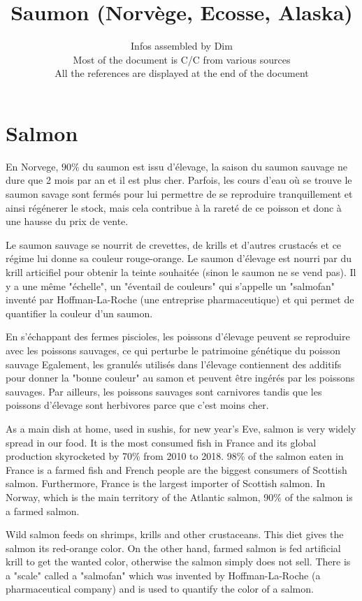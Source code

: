\documentclass{article}
\title{\textbf{Saumon (Norvège, Ecosse, Alaska)}}
\date{Infos assembled by Dim \\
Most of the document is C/C from various sources\\
All the references are displayed at the end of the document
}
\begin{document}
\maketitle

\newpage
\tableofcontents
\newpage

\section{Salmon}
En Norvege, $90 \%$ du saumon est issu d'élevage, la saison du saumon sauvage ne dure que 2 mois par an et il est plus cher. Parfois, les cours d'eau où se trouve le saumon savage sont fermés pour lui permettre de se reproduire tranquillement et ainsi régénerer le stock, mais cela contribue à la rareté de ce poisson et donc à une hausse du prix de vente.

Le saumon sauvage se nourrit de crevettes, de krills et d'autres crustacés et ce régime lui donne sa couleur rouge-orange.
Le saumon d'élevage est nourri par du krill articifiel pour obtenir la teinte souhaitée (sinon le saumon ne se vend pas). Il y a une même "échelle", un "éventail de couleurs" qui s'appelle un "salmofan" inventé par Hoffman-La-Roche (une entreprise pharmaceutique) et qui permet de quantifier la couleur d'un saumon.

En s'échappant des fermes piscioles, les poissons d'élevage peuvent se reproduire avec les poissons sauvages, ce qui perturbe le patrimoine génétique du poisson sauvage
Egalement, les granulés utilisés dans l'élevage contiennent des additifs pour donner la "bonne couleur" au samon et peuvent être ingérés par les poissons sauvages. Par ailleurs, les poissons sauvages sont carnivores tandis que les poissons d'élevage sont herbivores parce que c'est moins cher.

As a main dish at home, used in sushis, for new year's Eve, salmon is very widely spread in our food. It is the most consumed fish in France and its global production skyrocketed by 70\% from 2010 to 2018. 98\% of the salmon eaten in France is a farmed fish and French people are the biggest consumers of Scottish salmon. Furthermore, France is the largest importer of Scottish salmon.
In Norway, which is the main territory of the Atlantic salmon, 90\% of the salmon is a farmed salmon.

Wild salmon feeds on shrimps, krills and other crustaceans. This diet gives the salmon its red-orange color. On the other hand, farmed salmon is fed artificial krill to get the wanted color, otherwise the salmon simply does not sell.
There is a "scale" called a "salmofan" which was invented by Hoffman-La-Roche (a pharmaceutical company) and is used to quantify the color of a salmon.
\end{document}
